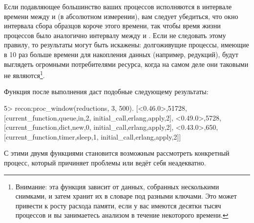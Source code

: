 \documentclass[11pt, oneside]{book}   	%
\begin{document}
Если подавляющее большинство ваших процессов исполняются в интервале времени между  и  (в абсолютном измерении), вам следует убедиться, что окно интервала сбора образцов короче этого времени, так чтобы время жизни процессов было аналогично интервалу между  и . Если не следовать этому правилу, то результаты могут быть искажены: долгоживущие процессы, имеющие в 10 раз больше времени для накопления данных (например, редукций), будут выглядеть огромными потребителями ресурса, когда на самом деле они таковыми не являются\footnote{Внимание: эта функция зависит от данных, собранных несколькими снимками, и затем хранит их в словаре под разными ключами. Это может привести к росту расхода памяти, если у вас имеются десятки тысяч процессов и вы занимаетесь анализом в течение некоторого времени.}.

Функция после выполнения даст подобные следующему результаты:

\begin{VerbatimEshell}
5> recon:proc_window(reductions, 3, 500).
[{<0.46.0>,51728,
  [{current_function,{queue,in,2}},
   {initial_call,{erlang,apply,2}}]},
 {<0.49.0>,5728,
  [{current_function,{dict,new,0}},
   {initial_call,{erlang,apply,2}}]},
 {<0.43.0>,650,
  [{current_function,{timer,sleep,1}},
   {initial_call,{erlang,apply,2}}]}]
\end{VerbatimEshell}

С этими двумя функциями становится возможным рассмотреть конкретный процесс, который причиняет проблемы или ведёт себя неадекватно.


\end{document}
